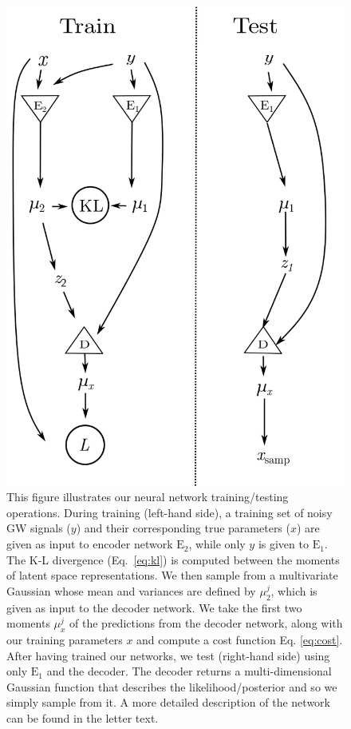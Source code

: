 \documentclass[%
showpacs,
 amsmath,amssymb,
 aps,
 twocolumn,
 prl,
 reprint,
floatfix,
]{revtex4-1}
\begin{document}
\begin{figure}
    \includegraphics[width=\columnwidth]{images/network_setup.png}
    \caption{\label{fig:network_config} This figure illustrates our neural
network training/testing operations. During training (left-hand side), a
training set of noisy \ac{GW} signals ($y$) and their corresponding true
parameters ($x$) are given as input to encoder network $\textrm{E}_2$, while
only $y$ is given to $\textrm{E}_1$. The K-L divergence (Eq.~\ref{eq:kl}) is
computed between the moments of latent space representations. We then sample
from a multivariate Gaussian whose mean and variances are defined by
$\mu^{j}_{2}$, which is given as input to the decoder network. We take the
first two moments $\mu^{j}_x$ of the predictions from the decoder network,
along with our training parameters $x$ and compute a cost function Eq.
\ref{eq:cost}. After having trained our networks, we test (right-hand side)
using only $\textrm{E}_1$ and the decoder.  The decoder returns a
multi-dimensional Gaussian function that describes the likelihood/posterior and
so we simply sample from it. A more detailed description of the network can be
found in the letter text.}  %
\end{figure}
\end{document}
